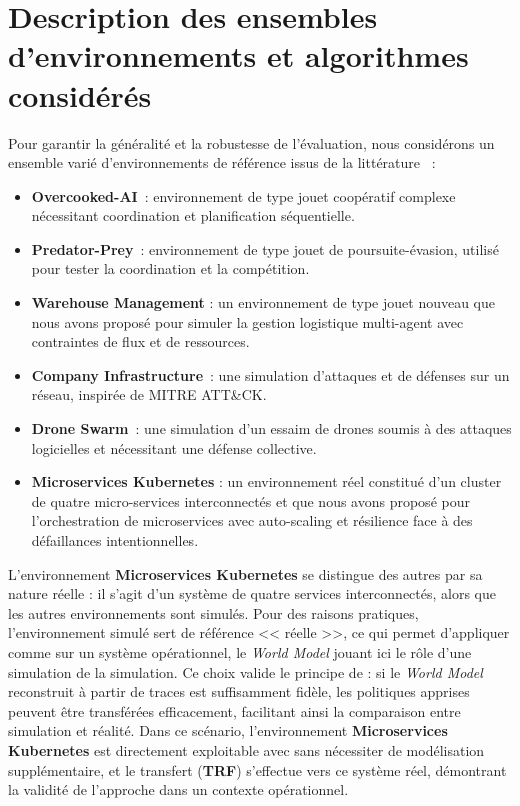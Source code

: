 \section{Description des ensembles d'environnements et algorithmes considérés}

Pour garantir la généralité et la robustesse de l'évaluation, nous considérons un ensemble varié d'environnements de référence issus de la littérature ~:
\begin{itemize}
  \item \textbf{Overcooked-AI}~\cite{overcookedai}: environnement de type jouet coopératif complexe nécessitant coordination et planification séquentielle.
  \item \textbf{Predator-Prey}~\cite{lowe2017multi}: environnement  de type jouet de poursuite-évasion, utilisé pour tester la coordination et la compétition.
  \item \textbf{Warehouse Management} : un environnement  de type jouet nouveau que nous avons proposé pour simuler la gestion logistique multi-agent avec contraintes de flux et de ressources.
  \item \textbf{Company Infrastructure}~\cite{cyberbattlesim}: une simulation d'attaques et de défenses sur un réseau, inspirée de MITRE ATT\&CK.
  \item \textbf{Drone Swarm}~\cite{cage_challenge_3_announcement}: une simulation d'un essaim de drones soumis à des attaques logicielles et nécessitant une défense collective.
  \item \textbf{Microservices Kubernetes} : un environnement réel constitué d'un cluster de quatre micro-services interconnectés et que nous avons proposé pour l'orchestration de microservices avec auto-scaling et résilience face à des défaillances intentionnelles.
\end{itemize}

L'environnement \textbf{Microservices Kubernetes} se distingue des autres par sa nature réelle : il s'agit d'un système de quatre services interconnectés, alors que les autres environnements sont simulés. Pour des raisons pratiques, l'environnement simulé sert de référence << réelle >>, ce qui permet d'appliquer  comme sur un système opérationnel, le \textit{World Model} jouant ici le rôle d'une simulation de la simulation. Ce choix valide le principe de  : si le \textit{World Model} reconstruit à partir de traces est suffisamment fidèle, les politiques apprises peuvent être transférées efficacement, facilitant ainsi la comparaison entre simulation et réalité. Dans ce scénario, l'environnement \textbf{Microservices Kubernetes} est directement exploitable avec  sans nécessiter de modélisation supplémentaire, et le transfert (\textbf{TRF}) s'effectue vers ce système réel, démontrant la validité de l'approche dans un contexte opérationnel.

